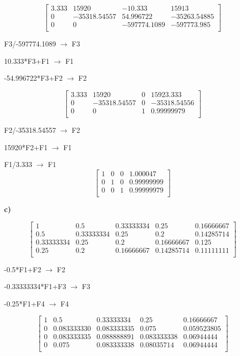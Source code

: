 \documentclass[12pt]{article}
\begin{document}
\[
\begin{bmatrix}
3.333 & 15920 & -10.333 & 15913\\
0 & -35318.54557 & 54.996722 & -35263.54885 \\
0 & 0 & -597774.1089 & -597773.985\\
\end{bmatrix}
\]

F3/-597774.1089  $\longrightarrow $ F3

10.333*F3+F1  $\longrightarrow $ F1

-54.996722*F3+F2 $\longrightarrow $ F2

\[
\begin{bmatrix}
3.333 & 15920 & 0 & 15923.333\\
0 & -35318.54557 & 0 & -35318.54556 \\
0 & 0 & 1 & 0.99999979\\
\end{bmatrix}
\]

F2/-35318.54557 $\longrightarrow $ F2

15920*F2+F1 $\longrightarrow $ F1

F1/3.333 $\longrightarrow $ F1
\[
\begin{bmatrix}
1 & 0 & 0 & 1.000047\\
0 & 1 & 0 & 0.99999999 \\
0 & 0 & 1 & 0.99999979\\
\end{bmatrix}
\]

\textbf{c)}

\[
\begin{bmatrix}
1 & 0.5 & 0.33333334 & 0.25 & 0.16666667 \\
0.5 & 0.33333334 & 0.25 & 0.2 & 0.14285714\\
0.33333334 & 0.25 & 0.2 & 0.16666667 & 0.125\\
0.25 & 0.2 & 0.16666667 & 0.14285714 & 0.11111111\\
\end{bmatrix}
\]

-0.5*F1+F2  $\longrightarrow $ F2

-0.33333334*F1+F3 $\longrightarrow $ F3

-0.25*F1+F4  $\longrightarrow $ F4

\[
\begin{bmatrix}
1 & 0.5 & 0.33333334 & 0.25 & 0.16666667 \\
0 & 0.083333330 & 0.083333335 & 0.075 & 0.059523805\\
0 & 0.083333335 & 0.088888891 & 0.083333338 & 0.06944444\\
0 & 0.075 & 0.083333338 & 0.08035714 & 0.06944444\\
\end{bmatrix}
\]
\end{document}
